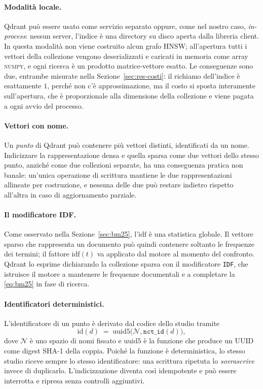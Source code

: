 \documentclass[pdflatex,sn-mathphys-num]{sn-jnl}
\theoremstyle{thmstyleone}
\theoremstyle{thmstyletwo}
\theoremstyle{thmstylethree}
\begin{document}
\paragraph{Modalità locale.} Qdrant \cite{qdrant} può essere usato come servizio separato oppure, come nel nostro caso, \emph{in-process}: nessun server, l'indice è una directory su disco aperta dalla libreria client. In questa modalità non viene costruito alcun grafo HNSW; all'apertura tutti i vettori della collezione vengono deserializzati e caricati in memoria come array \textsc{numpy}, e ogni ricerca è un prodotto matrice-vettore esatto. Le conseguenze sono due, entrambe misurate nella Sezione~\ref{sec:res-costi}: il richiamo dell'indice è esattamente $1$, perché non c'è approssimazione, ma il costo si sposta interamente sull'apertura, che è proporzionale alla dimensione della collezione e viene pagata a ogni avvio del processo.

\paragraph{Vettori con nome.} Un \emph{punto} di Qdrant può contenere più vettori distinti, identificati da un nome. Indicizzare la rappresentazione densa e quella sparsa come due vettori dello stesso punto, anziché come due collezioni separate, ha una conseguenza pratica non banale: un'unica operazione di scrittura mantiene le due rappresentazioni allineate per costruzione, e nessuna delle due può restare indietro rispetto all'altra in caso di aggiornamento parziale.

\paragraph{Il modificatore IDF.} Come osservato nella Sezione~\ref{sec:bm25}, l'$\mathrm{idf}$ è una statistica globale. Il vettore sparso che rappresenta un documento può quindi contenere soltanto le frequenze dei termini; il fattore $\mathrm{idf}(t)$ va applicato dal motore al momento del confronto. Qdrant lo esprime dichiarando la collezione sparsa con il modificatore \texttt{IDF}, che istruisce il motore a mantenere le frequenze documentali e a completare la \eqref{eq:bm25} in fase di ricerca.

\paragraph{Identificatori deterministici.} L'identificatore di un punto è derivato dal codice dello studio tramite
\begin{equation}
  \mathrm{id}(d) \;=\; \mathrm{uuid5}\big(\mathcal{N}, \texttt{nct\_id}(d)\big),
  \label{eq:uuid5}
\end{equation}
dove $\mathcal{N}$ è uno spazio di nomi fissato e $\mathrm{uuid5}$ è la funzione che produce un UUID come digest SHA-1 della coppia. Poiché la funzione è deterministica, lo stesso studio riceve sempre lo stesso identificatore: una scrittura ripetuta lo \emph{sovrascrive} invece di duplicarlo. L'indicizzazione diventa così idempotente e può essere interrotta e ripresa senza controlli aggiuntivi.
\end{document}
